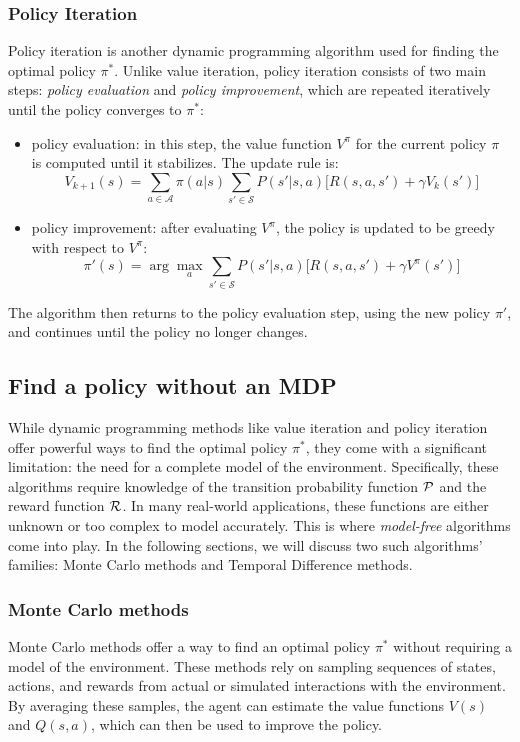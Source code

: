 \subsubsection{Policy Iteration}
Policy iteration is another dynamic programming algorithm used for finding the optimal policy \(\pi^*\). 
 Unlike value iteration, policy iteration consists of two main steps: 
 \emph{policy evaluation} and \emph{policy improvement}, 
 which are repeated iteratively until the policy converges to \(\pi^*\):
\begin{itemize}
  \item policy evaluation: in this step, 
   the value function \(V^\pi\) for the current policy \(\pi\) is computed until it stabilizes. 
   The update rule is:
  \begin{equation}
  V_{k+1}(s) = \sum_{a \in \mathcal{A}} \pi(a|s) \sum_{s' \in \mathcal{S}} P(s'|s, a) \Big[ R(s, a, s') + \gamma V_k(s') \Big]
  \end{equation}
  \item policy improvement: after evaluating \(V^\pi\), 
  the policy is updated to be greedy with respect to \(V^\pi\):
  \begin{equation}
  \pi'(s) = \arg \max_{a} \sum_{s' \in \mathcal{S}} P(s'|s, a) \Big[ R(s, a, s') + \gamma V^\pi(s') \Big]
  \end{equation}
\end{itemize}
The algorithm then returns to the policy evaluation step, 
 using the new policy \(\pi'\), and continues until the policy no longer changes.

\subsection{Find a policy without an MDP}
While dynamic programming methods like value iteration and policy iteration offer powerful ways to find the optimal policy \(\pi^*\), 
 they come with a significant limitation: 
 the need for a complete model of the environment. 
 Specifically, these algorithms require knowledge of the transition probability function \(\mathcal{P}\) and the reward function \(\mathcal{R}\). 
%
In many real-world applications, 
 these functions are either unknown or too complex to model accurately. 
 This is where \emph{model-free} algorithms come into play.
 In the following sections, we will discuss two such algorithms' families: 
 Monte Carlo methods and Temporal Difference methods.
\subsubsection{Monte Carlo methods}
Monte Carlo methods offer a way to find an optimal policy \(\pi^*\) without requiring a model of the environment. 
 These methods rely on sampling sequences of states, actions, and rewards from actual or simulated interactions with the environment. 
 By averaging these samples, the agent can estimate the value functions \(V(s)\) and \(Q(s, a)\), which can then be used to improve the policy.

